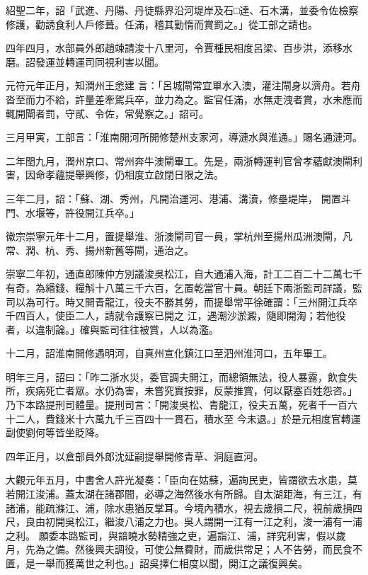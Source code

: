 \begin{pinyinscope}
 紹聖二年，詔「武進、丹陽、丹徒縣界沿河堤岸及石□達、石木溝，並委令佐檢察修護，勸誘食利人戶修葺。任滿，稽其勤惰而賞罰之。」從工部之請也。



 四年四月，水部員外郎趙竦請浚十八里河，令賈種民相度呂梁、百步洪，添移水磨。詔發運並轉運司同視利害以聞。



 元符元年正月，知潤州王悆建
 言：「呂城閘常宜單水入澳，灌注閘身以濟舟。若舟沓至而力不給，許量差牽駕兵卒，並力為之。監官任滿，水無走洩者賞，水未應而輒開閘者罰，守貳、令佐，常覺察之。」詔可。



 三月甲寅，工部言：「淮南開河所開修楚州支家河，導漣水與淮通。」賜名通漣河。



 二年閏九月，潤州京口、常州奔牛澳閘畢工。先是，兩浙轉運判官曾孝蘊獻澳閘利害，因命孝蘊提舉興修，仍相度立啟閉日限之法。



 三年二月，詔：「蘇、湖、秀州，凡開治運河、港浦、溝瀆，修壘堤岸，
 開置斗門、水堰等，許役開江兵卒。」



 徽宗崇寧元年十二月，置提舉淮、浙澳閘司官一員，掌杭州至揚州瓜洲澳閘，凡常、潤、杭、秀、揚州新舊等閘，通治之。



 崇寧二年初，通直郎陳仲方別議浚吳松江，自大通浦入海，計工二百二十二萬七千有奇，為緡錢、糧斛十八萬三千六百，乞置乾當官十員。朝廷下兩浙監司詳議，監司以為可行。時又開青龍江，役夫不勝其勞，而提舉常平徐確謂：「三州開江兵卒千四百人，使臣二人，請就令護察已開之
 江，遇潮沙淤澱，隨即開淘；若他役者，以違制論。」確與監司往往被賞，人以為濫。



 十二月，詔淮南開修遇明河，自真州宣化鎮江口至泗州淮河口，五年畢工。



 明年三月，詔曰：「昨二浙水災，委官調夫開江，而總領無法，役人暴露，飲食失所，疾病死亡者眾。水仍為害，未嘗究實按罪，反蒙推賞，何以厭塞百姓怨咨。」乃下本路提刑司體量。提刑司言：「開浚吳松、青龍江，役夫五萬，死者千一百六十二人，費錢米十六萬九千三百四十一貫石，積水至
 今未退。」於是元相度官轉運副使劉何等皆坐貶降。



 四年正月，以倉部員外郎沈延嗣提舉開修青草、洞庭直河。



 大觀元年五月，中書舍人許光凝奏：「臣向在姑蘇，遍詢民吏，皆謂欲去水患，莫若開江浚浦。蓋太湖在諸郡間，必導之海然後水有所歸。自太湖距海，有三江，有諸浦，能疏滌江、浦，除水患猶反掌耳。今境內積水，視去歲損二尺，視前歲損四尺，良由初開吳松江，繼浚八浦之力也。吳人謂開一江有一江之利，浚一浦有一浦之利。
 願委本路監司，與諳曉水勢精強之吏，遍詣江、浦，詳究利害，假以歲月，先為之備。然後興夫調役，可使公無費財，而歲供常足；人不告勞，而民食不匱，是一舉而獲萬世之利也。」詔吳擇仁相度以聞，開江之議復興矣。




\end{pinyinscope}
